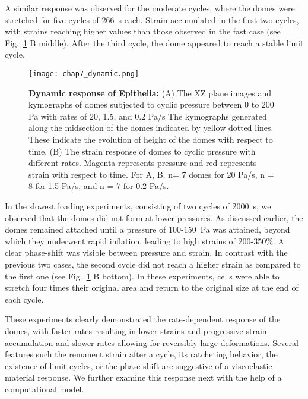 A similar response was observed for the moderate cycles, where the domes were stretched for five cycles of 266~s each. Strain accumulated in the first two cycles, with strains reaching higher values than those observed in the fast case (see Fig.~\ref{fig_7_6} B middle). After the third cycle, the dome appeared to reach a stable limit cycle.

\begin{figure}[h!]
	\centering
	\texttt{[image: chap7\_dynamic.png]}
	\caption{\label{fig_7_6} \textbf{Dynamic response of Epithelia:} (A) The XZ plane images and kymographs of domes subjected to cyclic pressure between 0 to 200 Pa with rates of 20, 1.5, and 0.2 Pa/s The kymographs generated along the midsection of the domes indicated by yellow dotted lines. These indicate the evolution of height of the domes with respect to time. (B) The strain response of domes to cyclic pressure with different rates. Magenta represents pressure and red represents strain with respect to time. For A, B, n= 7 domes for 20 Pa/s, n = 8 for 1.5 Pa/s, and n = 7 for 0.2 Pa/s. 
	}
\end{figure}

In the slowest loading experiments, consisting of two cycles of 2000~s, we observed that the domes did not form at lower pressures. As discussed earlier, the domes remained attached until a pressure of 100-150~Pa was attained, beyond which they underwent rapid inflation, leading to high strains of 200-350\%. A clear phase-shift was visible between pressure and strain. In contrast with the previous two cases, the second cycle did not reach a higher strain as compared to the first one (see Fig.~\ref{fig_7_6} B bottom). In these experiments, cells were able to stretch four times their original area and return to the original size at the end of each cycle.

These experiments clearly demonstrated the rate-dependent response of the domes, with faster rates resulting in lower strains and progressive strain accumulation and slower rates allowing for reversibly large deformations. Several features such the remanent strain after a cycle, its ratcheting behavior, the existence of limit cycles, or the phase-shift are suggestive of a viscoelastic material response. We further examine this response next with the help of a computational model.



